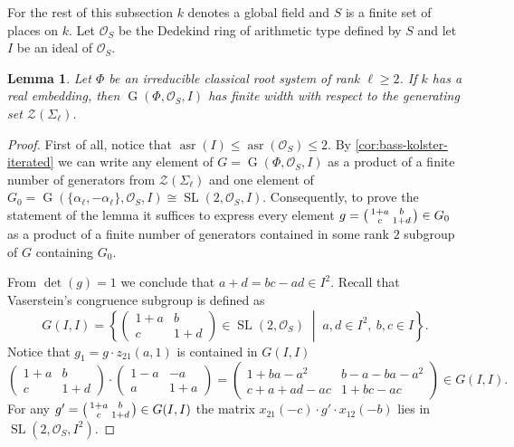 \documentclass[11pt]{amsart}
\theoremstyle{plain}
\numberwithin{equation}{section}
\newtheorem{lemma}{Lemma}
\numberwithin{lemma}{section}
\theoremstyle{definition}
\theoremstyle{remark}
\DeclareMathOperator{\G}{G}
\DeclareMathOperator{\SL}{SL}
\DeclareMathOperator{\asr}{asr}
\begin{document}
For the rest of this subsection $k$ denotes a global field and $S$ is a finite set of places on $k$. 
Let $\mathcal{O}_S$ be the Dedekind ring of arithmetic type defined by $S$ and let $I$ be an ideal of $\mathcal{O}_S$.
\begin{lemma}\label{lemma:width-dedekind}
Let $\Phi$ be an irreducible classical root system of rank $\ell \geqslant 2$.
If $k$ has a real embedding, then $\G(\Phi, \mathcal{O}_S, I)$ has finite width with respect to the generating set $\mathcal{Z}(\Sigma_\ell)$.
\end{lemma}
\begin{proof}
First of all, notice that $\asr(I) \leqslant \asr(\mathcal{O}_S) \leqslant 2$. 
By \cref{cor:bass-kolster-iterated} we can write any element 
of $G=\G(\Phi, \mathcal{O}_S, I)$ as a product of a finite number of generators from $\mathcal{Z}(\Sigma_\ell)$ and one element of 
$G_0 = \G(\{\alpha_\ell, -\alpha_\ell\}, \mathcal{O}_S, I)\cong\SL(2, \mathcal{O}_S, I)$.
Consequently, to prove the statement of the lemma it suffices to express every element 
$g = \begin{psmallmatrix}1+a & b \\ c & 1+d \end{psmallmatrix} \in G_0$
as a product of a finite number of generators contained in some rank $2$ subgroup of $G$ containing $G_0$.

From $\det(g)=1$ we conclude that $a+d=bc-ad\in I^2$. 
Recall that Vaserstein's congruence subgroup is defined as
\[ G(I, I)=\left\{ \begin{pmatrix}1+a & b \\ c & 1+d\end{pmatrix}\in\SL(2, \mathcal{O}_S)\;\middle|\; a, d\in I^2, \ b, c\in I \right\}. \]
Notice that $g_1=g\cdot z_{21}(a, 1)$ is contained in $G(I, I)$
\[ \begin{pmatrix} 1+a & b \\ c & 1+d \end{pmatrix} \cdot \begin{pmatrix} 1-a & -a \\ a & 1+a \end{pmatrix} = \begin{pmatrix} 1+ba-a^2 & b-a-ba-a^2 \\ c+a+ad-ac & 1+bc-ac \end{pmatrix} \in G(I, I). \]
For any $g'=\begin{psmallmatrix}1+a & b \\ c & 1+d\end{psmallmatrix}\in G(I, I)$ the matrix $x_{21}(-c)\cdot g'\cdot x_{12}(-b)$ lies in $\SL\left(2, \mathcal{O}_S, I^2\right)$.


\end{proof}
\end{document}
